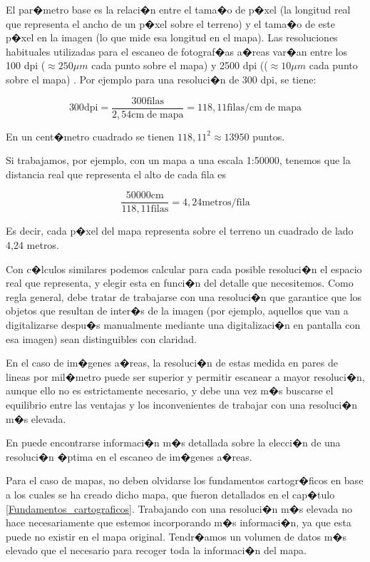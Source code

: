 El par�metro base es la relaci�n entre el tama�o de p�xel (la longitud real que representa el ancho de un p�xel sobre el terreno) y el tama�o de este p�xel en la imagen (lo que mide esa longitud en el mapa). Las resoluciones habituales utilizadas para el escaneo de fotograf�as a�reas var�an entre los 100 dpi ($\approx 250 \mu m$ cada punto sobre el mapa) y 2500 dpi (($\approx 10 \mu m$ cada punto sobre el mapa) \cite{Welch1996Onward}. Por ejemplo para una resoluci�n de 300 dpi, se tiene:

\begin{equation}
300 \mathrm{dpi} = \frac{300\mathrm{filas}}{2,54 \mathrm{cm\; de\; mapa}} = 118,11 \mathrm{filas/cm\; de\; mapa}
\end{equation}

En un cent�metro cuadrado se tienen $118,11^2\approx13950$ puntos.

Si trabajamos, por ejemplo, con un mapa a una escala 1:50000, tenemos que la distancia real que representa el alto de cada fila es

\begin{equation}
\frac{50000 \mathrm{cm}}{118,11 \mathrm{filas}} = 4,24 \mathrm{metros}/\mathrm{fila}
\end{equation}

Es decir, cada p�xel del mapa representa sobre el terreno un cuadrado de lado 4,24 metros.

Con c�lculos similares podemos calcular para cada posible resoluci�n el espacio real que representa, y elegir esta en funci�n del detalle que necesitemos. Como regla general, debe tratar de trabajarse con una resoluci�n que garantice que los objetos que resultan de inter�s de la imagen (por ejemplo, aquellos que van a digitalizarse despu�s manualmente mediante una digitalizaci�n en pantalla con esa imagen) sean distinguibles con claridad. 

En el caso de im�genes a�reas, la resoluci�n de estas medida en pares de lineas por mil�metro puede ser superior y permitir escanear a mayor resoluci�n, aunque ello no es estrictamente necesario, y debe una vez m�s buscarse el equilibrio entre las ventajas y los inconvenientes de trabajar con una resoluci�n m�s elevada.

En \cite{Welch1996Onward} puede encontrarse informaci�n m�s detallada sobre la elecci�n de una resoluci�n �ptima en el escaneo de im�genes a�reas.

Para el caso de mapas, no deben olvidarse los fundamentos cartogr�ficos en base a los cuales se ha creado dicho mapa, que fueron detallados en el cap�tulo \ref{Fundamentos_cartograficos}. Trabajando con una resoluci�n m�s elevada no hace necesariamente que estemos incorporando m�s informaci�n, ya que esta puede no existir en el mapa original. Tendr�amos un volumen de datos m�s elevado que el necesario para recoger toda la informaci�n del mapa.


